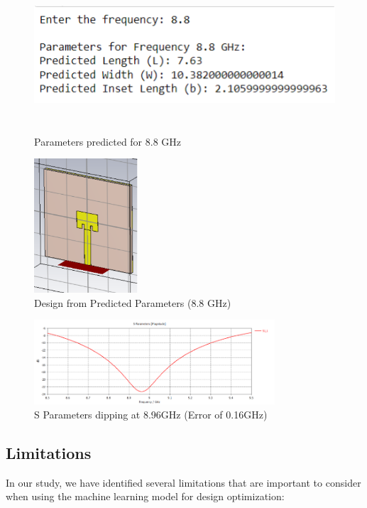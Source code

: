 \documentclass[a4paper,12pt]{report}
\begin{document}
\begin{figure}[H]
    \centering
    \begin{minipage}{0.48\textwidth}
        \centering
        \includegraphics[width=\textwidth,height =5cm]{data88.png}
        \caption{Parameters predicted for 8.8 GHz}
        \label{fig:4ghz_inset1}
    \end{minipage}
    \hfill %
    \begin{minipage}{0.48\textwidth}
        \centering
        \includegraphics[width=\textwidth,height =5cm]{pred88img.png}
        \caption{Design from Predicted Parameters (8.8 GHz)}
        \label{fig:4ghz_inset2}
    \end{minipage}
\end{figure}
\begin{figure}[H]
    \centering
    \includegraphics[width=0.8\textwidth]{pred88.png}
    \caption{S Parameters dipping at 8.96GHz (Error of 0.16GHz)}
    \label{fig:width_calculator}
\end{figure}

\subsection{Limitations}
In our study, we have identified several limitations that are important to consider when using the machine learning model for design optimization:
\end{document}
